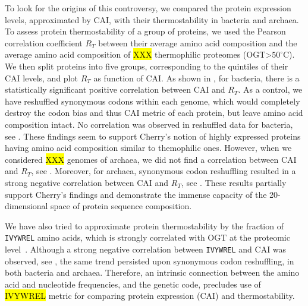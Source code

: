 \documentclass[10pt,letterpaper]{article}
\begin{document}
To look for the origins of this controversy, we compared the protein expression levels, approximated by CAI, with their thermostability in bacteria and archaea. To assess protein thermostability of a group of proteins, we used the Pearson correlation coefficient $R_T$ between their average amino acid composition and the average amino acid composition of \hl{XXX} thermophilic proteomes (OGT>$50^\circ \mathrm{C}$).  We then split proteins into five groups, corresponding to the quintiles of their CAI levels, and plot $R_T$ as function of CAI. As shown in , for bacteria, there is a statistically significant positive correlation between CAI and $R_T$. As a control, we have reshuffled synonymous codons within each genome, which would completely destroy the codon bias and thus CAI metric of each protein, but leave amino acid composition intact. No correlation was observed in reshuffled data for bacteria, see . These findings seem to support Cherry's notion of highly expressed proteins having amino acid composition similar to themophilic ones. However, when we considered \hl{XXX} genomes of archaea, we did not find a correlation between CAI and $R_T$, see . Moreover, for archaea, synonymous codon reshuffling resulted in a strong negative correlation between CAI and $R_T$, see . These results partially support Cherry's findings and demonstrate the immense capacity of the 20-dimensional space of protein sequence composition. 

We have also tried to approximate protein thermostability by the fraction of \texttt{IVYWREL} amino acids, which is strongly correlated with OGT at the proteomic level~\cite{Zeldovich2007Protein}. Although a strong negative correlation between \texttt{IVYWREL} and CAI was observed, see , the same trend persisted upon synonymous codon reshuffling, in both bacteria and archaea. Therefore, an intrinsic connection between the amino acid and nucleotide frequencies, and the genetic code, precludes use of \hl{IVYWREL} metric for comparing protein expression (CAI) and thermostability.


\end{document}
